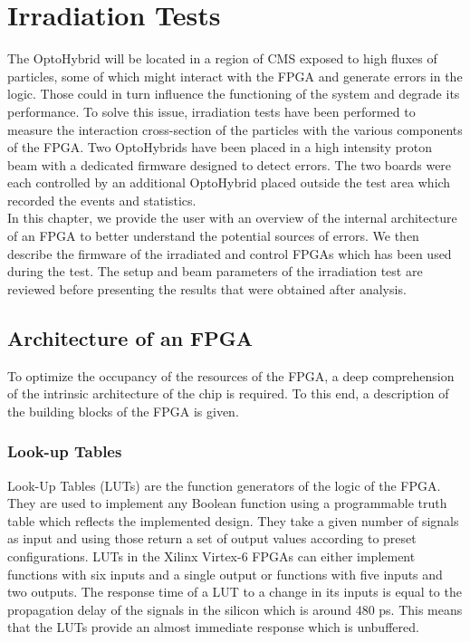 \chapter{Irradiation Tests}
\label{chap:II-6-irradiation}

  The OptoHybrid will be located in a region of CMS exposed to high fluxes of particles, some of which might interact with the FPGA and generate errors in the logic. Those could in turn influence the functioning of the system and degrade its performance. To solve this issue, irradiation tests have been performed to measure the interaction cross-section of the particles with the various components of the FPGA. Two OptoHybrids have been placed in a high intensity proton beam with a dedicated firmware designed to detect errors. The two boards were each controlled by an additional OptoHybrid placed outside the test area which recorded the events and statistics. \\

  In this chapter, we provide the user with an overview of the internal architecture of an FPGA to better understand the potential sources of errors. We then describe the firmware of the irradiated and control FPGAs which has been used during the test. The setup and beam parameters of the irradiation test are reviewed before presenting the results that were obtained after analysis.

  \section{Architecture of an FPGA}

    To optimize the occupancy of the resources of the FPGA, a deep comprehension of the intrinsic architecture of the chip is required. To this end, a description of the building blocks of the FPGA is given.

    \subsection{Look-up Tables}

      Look-Up Tables (LUTs) are the function generators of the logic of the FPGA. They are used to implement any Boolean function using a programmable truth table which reflects the implemented design. They take a given number of signals as input and using those return a set of output values according to preset configurations. LUTs in the Xilinx Virtex-6 FPGAs can either implement functions with six inputs and a single output or functions with five inputs and two outputs. The response time of a LUT to a change in its inputs is equal to the propagation delay of the signals in the silicon which is around 480 ps. This means that the LUTs provide an almost immediate response which is unbuffered.

